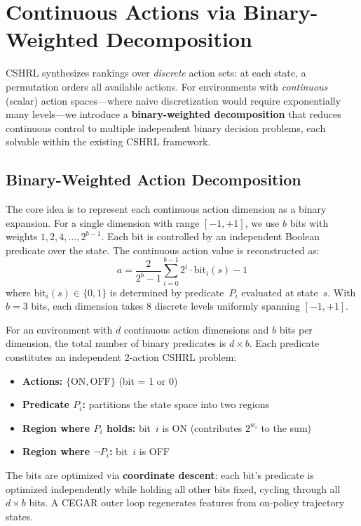 \documentclass[9pt,a4paper]{article}
\theoremstyle{plain}
\theoremstyle{definition}
\theoremstyle{remark}
\begin{document}
\section{Continuous Actions via Binary-Weighted Decomposition}
\label{sec:bipedal}

CSHRL synthesizes rankings over \emph{discrete} action sets: at each
state, a permutation orders all available actions.  For environments
with \emph{continuous} (scalar) action spaces---where naive
discretization would require exponentially many levels---we introduce
a \textbf{binary-weighted decomposition} that reduces continuous
control to multiple independent binary decision problems, each
solvable within the existing CSHRL framework.

\subsection{Binary-Weighted Action Decomposition}

The core idea is to represent each continuous action dimension as
a binary expansion.  For a single dimension with range $[-1, +1]$,
we use $b$ bits with weights $1, 2, 4, \ldots, 2^{b-1}$.  Each
bit is controlled by an independent Boolean predicate over the state.
The continuous action value is reconstructed as:
\[
  a = \frac{2}{2^b - 1} \sum_{i=0}^{b-1} 2^i \cdot \text{bit}_i(s) - 1
\]
where $\text{bit}_i(s) \in \{0, 1\}$ is determined by predicate~$P_i$
evaluated at state~$s$.  With $b = 3$ bits, each dimension takes
8 discrete levels uniformly spanning $[-1, +1]$.

For an environment with $d$ continuous action dimensions and $b$
bits per dimension, the total number of binary predicates is
$d \times b$.  Each predicate constitutes an independent 2-action
CSHRL problem:
\begin{itemize}
\item \textbf{Actions:} $\{\text{ON}, \text{OFF}\}$ (bit = 1 or 0)
\item \textbf{Predicate $P_i$:} partitions the state space into two
      regions
\item \textbf{Region where $P_i$ holds:} bit~$i$ is ON (contributes
      $2^{w_i}$ to the sum)
\item \textbf{Region where $\neg P_i$:} bit~$i$ is OFF
\end{itemize}

The bits are optimized via \textbf{coordinate descent}: each bit's
predicate is optimized independently while holding all other bits
fixed, cycling through all $d \times b$ bits.  A CEGAR outer loop
regenerates features from on-policy trajectory states.
\end{document}

